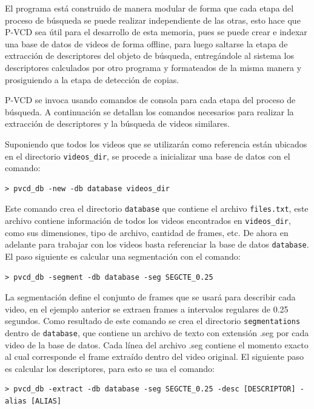 El programa está construido de manera modular de forma que cada etapa del proceso de búsqueda se puede realizar independiente de las otras, esto hace que P-VCD sea útil para el desarrollo de esta memoria, pues se puede crear e indexar una base de datos de videos de forma offline, para luego saltarse la etapa de extracción de descriptores del objeto de búsqueda, entregándole al sistema los descriptores calculados por otro programa y formateados de la misma manera y prosiguiendo a la etapa de detección de copias.

P-VCD se invoca usando comandos de consola para cada etapa del proceso de búsqueda. A continuación se detallan los comandos necesarios para realizar la extracción de descriptores y la búsqueda de videos similares.

Suponiendo que todos los videos que se utilizarán como referencia están ubicados en el directorio \texttt{videos\_dir}, se procede a inicializar una base de datos con el comando:
\begin{lstlisting}[style=BashInputStyle]
    > pvcd_db -new -db database videos_dir
\end{lstlisting}

Este comando crea el directorio \texttt{database} que contiene el archivo \texttt{files.txt}, este archivo contiene información de todos los videos encontrados en \texttt{videos\_dir}, como sus dimensiones, tipo de archivo, cantidad de frames, etc. De ahora en adelante para trabajar con los videos basta referenciar la base de datos \texttt{database}. El paso siguiente es calcular una segmentación con el comando:
\begin{lstlisting}[style=BashInputStyle]
    > pvcd_db -segment -db database -seg SEGCTE_0.25
\end{lstlisting}
La segmentación define el conjunto de frames que se usará para describir cada video, en el ejemplo anterior se extraen frames a intervalos regulares de 0.25 segundos. Como resultado de este comando se crea el directorio \texttt{segmentations} dentro de \texttt{database}, que contiene un archivo de texto con extensión .seg por cada video de la base de datos. Cada línea del archivo .seg contiene el momento exacto al cual corresponde el frame extraído dentro del video original.
El siguiente paso es calcular los descriptores, para esto se usa el comando:
\begin{lstlisting}[style=BashInputStyle]
    > pvcd_db -extract -db database -seg SEGCTE_0.25 -desc [DESCRIPTOR] -alias [ALIAS]
\end{lstlisting}

